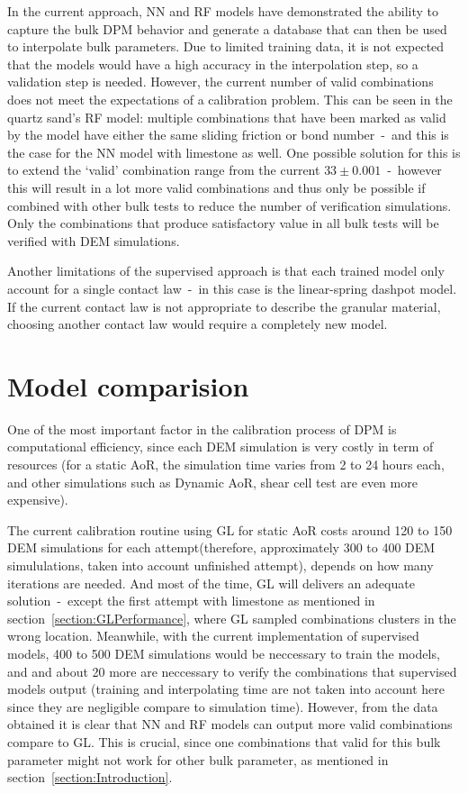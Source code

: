 In the current approach, NN and RF models have demonstrated the ability to capture the bulk DPM behavior and generate a database that can then be used to interpolate bulk parameters. Due to limited training data, it is not expected that the models would have a high accuracy in the interpolation step, so a validation step is needed. However, the current number of valid combinations does not meet the expectations of a calibration problem. This can be seen in the quartz sand's RF model: multiple combinations that have been marked as valid by the model have either the same sliding friction or bond number~-~and this is the case for the NN model with limestone as well. One possible solution for this is to extend the `valid' combination range from the current $33\pm0.001$~-~however this will result in a lot more valid combinations and thus only be possible if combined with other bulk tests to reduce the number of verification simulations. Only the combinations that produce satisfactory value in all bulk tests will be verified with DEM simulations. 

Another limitations of the supervised approach is that each trained model only account for a single contact law~-~in this case is the linear-spring dashpot model. If the current contact law is not appropriate to describe the granular material, choosing another contact law would require a completely new model. 



\section{Model comparision}\label{section:discussion}

One of the most important factor in the calibration process of DPM is computational efficiency, since each DEM simulation is very costly in term of resources (for a static AoR, the simulation time varies from 2 to 24 hours each, and other simulations such as Dynamic AoR, shear cell test are even more expensive). 

The current calibration routine using GL for static AoR costs around 120 to 150 DEM simulations for each attempt(therefore, approximately 300 to 400 DEM simululations, taken into account unfinished attempt), depends on how many iterations are needed. And most of the time, GL will delivers an adequate solution~-~except the first attempt with limestone as mentioned in section~\ref{section:GLPerformance}, where GL sampled combinations clusters in the wrong location. Meanwhile, with the current implementation of supervised models, 400 to 500 DEM simulations would be neccessary to train the models, and and about 20 more are neccessary to verify the combinations that supervised models output (training and interpolating time are not taken into account here since they are negligible compare to simulation time). However, from the data obtained it is clear that NN and RF models can output more valid combinations compare to GL. This is crucial, since one combinations that valid for this bulk parameter might not work for other bulk parameter, as mentioned in section~\ref{section:Introduction}. 

